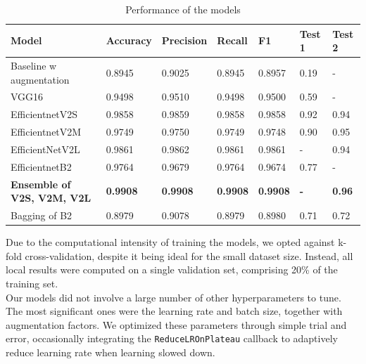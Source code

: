 \documentclass[11pt]{article}
\begin{document}
\begin{multicols}{2}
\begin{table}[t]
        \centering
        \setlength{\tabcolsep}{3pt}
        \caption{Performance of the models}
        \begin{tabularx}{\textwidth}{lYYYYYY}
            \toprule
            Model                     & Accuracy & Precision & Recall & F1     & Test 1 & Test 2 \\
            \midrule
            Baseline w augmentation   & 0.8945   & 0.9025    & 0.8945 & 0.8957 & 0.19   & -      \\
            VGG16                     & 0.9498   & 0.9510    & 0.9498 & 0.9500 & 0.59   & -      \\
            EfficientnetV2S           & 0.9858   & 0.9859    & 0.9858 & 0.9858 & 0.92   & 0.94   \\
            EfficientnetV2M           & 0.9749   & 0.9750    & 0.9749 & 0.9748 & 0.90   & 0.95   \\
            EfficientNetV2L           & 0.9861   & 0.9862    & 0.9861 & 0.9861 & -      & 0.94   \\
            EfficientnetB2            & 0.9764   & 0.9679    & 0.9764 & 0.9674 & 0.77   & -      \\
            \textbf{Ensemble of V2S, V2M, V2L}  & \textbf{0.9908}   & \textbf{0.9908}    & \textbf{0.9908} & \textbf{0.9908} & \textbf{-}   & \textbf{0.96}  \\
            Bagging of B2             & 0.8979   & 0.9078    & 0.8979 & 0.8980 & 0.71   & 0.72   \\
            \bottomrule
        \end{tabularx}
        \label{tab:Performance}
    \end{table}
    Due to the computational intensity of training the models, we opted against k-fold cross-validation, despite it being ideal for the small dataset size. Instead, all local results were computed on a single validation set, comprising 20\% of the training set.\\
    Our models did not involve a large number of other hyperparameters to tune. The most significant ones were the learning rate and batch size, together with augmentation factors. We optimized these parameters through simple trial and error, occasionally integrating the \texttt{ReduceLROnPlateau} callback to  adaptively reduce learning rate when learning slowed down.


\end{multicols}
\end{document}
